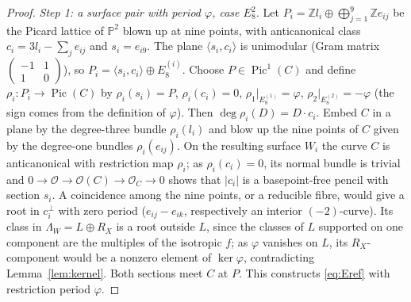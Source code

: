 \documentclass[11pt]{article}
\newcommand{\Z}{\mathbb Z}
\newcommand{\PP}{\mathbb P}
\newcommand{\Pic}{\operatorname{Pic}}
\theoremstyle{definition}
\theoremstyle{remark}
\begin{document}
\begin{proof}
\emph{Step 1: a surface pair with period \(\varphi\), case \(E_8^2\).}
Let \(P_i=\Z l_i\oplus\bigoplus_{j=1}^9\Z e_{ij}\) be the Picard
lattice of \(\PP^2\) blown up at nine points, with anticanonical class
\(c_i=3l_i-\sum_je_{ij}\) and \(s_i=e_{i9}\). The plane
\(\langle s_i,c_i\rangle\) is unimodular (Gram matrix
\(\left(\begin{smallmatrix}-1&1\\1&0\end{smallmatrix}\right)\)), so
\(P_i=\langle s_i,c_i\rangle\oplus E_8^{(i)}\). Choose \(P\in\Pic^1(C)\)
and define \(\rho_i\colon P_i\to\Pic(C)\) by \(\rho_i(s_i)=P\),
\(\rho_i(c_i)=0\), \(\rho_1|_{E_8^{(1)}}=\varphi\),
\(\rho_2|_{E_8^{(2)}}=-\varphi\) (the sign comes from the definition
of \(\varphi\)).
Then \(\deg\rho_i(D)=D\cdot c_i\). Embed \(C\) in a plane by the
degree-three bundle \(\rho_i(l_i)\) and blow up the nine points of
\(C\) given by the degree-one bundles \(\rho_i(e_{ij})\). On the
resulting surface \(W_i\) the curve \(C\) is anticanonical with
restriction map \(\rho_i\); as \(\rho_i(c_i)=0\), its normal bundle is
trivial and \(0\to\mathcal O\to\mathcal O(C)\to\mathcal O_C\to0\)
shows that \(|c_i|\) is a basepoint-free pencil with section \(s_i\).
A coincidence among the nine points, or a reducible fibre, would give
a root in \(c_i^\perp\) with zero period (\(e_{ij}-e_{ik}\),
respectively an interior \((-2)\)-curve). Its class in
\(\Lambda_W=L\oplus R_X\) is a root outside \(L\), since the classes
of \(L\) supported on one component are the multiples of the
isotropic \(f\); as \(\varphi\) vanishes on \(L\), its
\(R_X\)-component would be a nonzero element of \(\ker\varphi\),
contradicting Lemma~\ref{lem:kernel}. Both sections meet \(C\) at
\(P\). This constructs \eqref{eq:Eref} with restriction period
\(\varphi\).


\end{proof}
\end{document}
